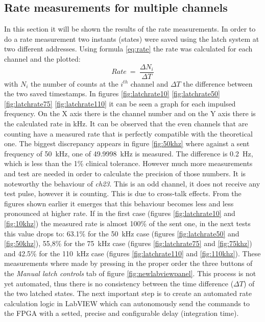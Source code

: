 \subsection{Rate measurements for multiple channels}\label{RateMeasurements}
\noindent In this section it will be shown the results of the rate measurements. In order to do a rate measurement two instants (states) were saved using the latch system at two different addresses. Using formula \ref{eq:rate} the rate was calculated for each channel and the plotted:
\begin{equation}\label{eq:rate}
	Rate\:=\: \frac{\Delta N_i}{\Delta T}
\end{equation}
\noindent with $N_i$ the number of counts at the $i^{th}$ channel and $\Delta T$ the difference between the two saved timestamps.
In figures \ref{fig:latchrate10} \ref{fig:latchrate50} \ref{fig:latchrate75} \ref{fig:latchrate110} it can be seen a graph for each impulsed frequency. On the X axis there is the channel number and on the Y axis there is the calculated rate in kHz. It can be observed that the even channels that are counting have a measured rate that is perfectly compatible with the theoretical one.
The biggest discrepancy appears in figure \ref{fig:50khz} where against a sent frequency of 50~kHz, one of 49.9998~kHz is measured. The difference is 0.2~Hz, which is less than the 1\% clinical tolerance. However much more measurements and test are needed in order to calculate the precision of those numbers.
It is noteworthy the behaviour of \textit{ch23}. This is an odd channel, it does not receive any test pulse, however it is counting. This is due to cross-talk effects.
From the figures shown earlier it emerges that this behaviour becomes less and less pronounced at higher rate.
If in the first case (figures \ref{fig:latchrate10} and \ref{fig:10khz}) the measured rate is almost 100\% of the sent one, in the next tests this value drops to:
63.1\% for the 50~kHz case (figures \ref{fig:latchrate50} and \ref{fig:50khz}),
55,8\% for the 75~kHz case (figures \ref{fig:latchrate75} and \ref{fig:75khz}) and
42.5\% for the 110~kHz case (figures \ref{fig:latchrate110} and \ref{fig:110khz}).
\newline
\noindent These measurements where made by pressing in the proper order the three buttons of the \textit{Manual latch controls} tab of figure \ref{fig:newlabviewpanel}.
This process is not yet automated, thus there is no consistency between the time difference ($\Delta T$) of the two latched states.
The next important step is to create an automated rate calculation logic in LabVIEW which can autonomously send the commands to the FPGA with a setted, precise and configurable delay (integration time).
